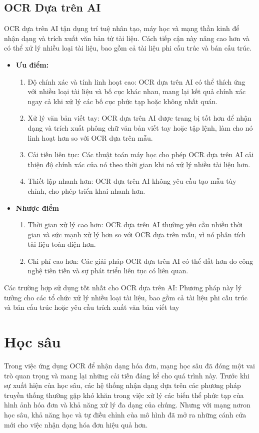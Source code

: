 \subsection{OCR Dựa trên AI}
OCR dựa trên AI tận dụng trí tuệ nhân tạo, máy học và mạng thần kinh để nhận dạng và trích xuất văn bản từ tài liệu. Cách tiếp cận này nâng cao hơn và có thể xử lý nhiều loại tài liệu, bao gồm cả tài liệu phi cấu trúc và bán cấu trúc. \cite{template-ai-ocr}
\begin{itemize}
    \item[] \textbf{Ưu điểm:} \begin{enumerate}
            \item Độ chính xác và tính linh hoạt cao: OCR dựa trên AI có thể thích ứng với nhiều loại tài liệu và bố cục khác nhau, mang lại kết quả chính xác ngay cả khi xử lý các bố cục phức tạp hoặc không nhất quán.
            \item Xử lý văn bản viết tay: OCR dựa trên AI được trang bị tốt hơn để nhận dạng và trích xuất phông chữ văn bản viết tay hoặc tập lệnh, làm cho nó linh hoạt hơn so với OCR dựa trên mẫu.
            \item Cải tiến liên tục: Các thuật toán máy học cho phép OCR dựa trên AI cải thiện độ chính xác của nó theo thời gian khi nó xử lý nhiều tài liệu hơn.
            \item Thiết lập nhanh hơn: OCR dựa trên AI không yêu cầu tạo mẫu tùy chỉnh, cho phép triển khai nhanh hơn.
        \end{enumerate}
    \item[] \textbf{Nhược điểm} \begin{enumerate}
            \item Thời gian xử lý cao hơn: OCR dựa trên AI thường yêu cầu nhiều thời gian và sức mạnh xử lý hơn so với OCR dựa trên mẫu, vì nó phân tích tài liệu toàn diện hơn.
            \item Chi phí cao hơn: Các giải pháp OCR dựa trên AI có thể đắt hơn do công nghệ tiên tiến và sự phát triển liên tục có liên quan.

        \end{enumerate}
\end{itemize}

Các trường hợp sử dụng tốt nhất cho OCR dựa trên AI: Phương pháp này lý tưởng cho các tổ chức xử lý nhiều loại tài liệu, bao gồm cả tài liệu phi cấu trúc và bán cấu trúc hoặc yêu cầu trích xuất văn bản viết tay

\section{Học sâu}
Trong việc ứng dụng OCR để nhận dạng hóa đơn, mạng học sâu đã đóng một vai trò quan trọng và mang lại những cải tiến đáng kể cho quá trình này. Trước khi sự xuất hiện của học sâu, các hệ thống nhận dạng dựa trên các phương pháp truyền thống thường gặp khó khăn trong việc xử lý các biến thể phức tạp của hình ảnh hóa đơn và khả năng xử lý đa dạng của chúng. Nhưng với mạng nơron học sâu, khả năng học và tự điều chỉnh của mô hình đã mở ra những cánh cửa mới cho việc nhận dạng hóa đơn hiệu quả hơn.

